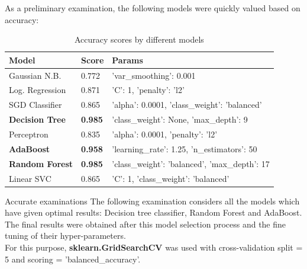 \documentclass{beamer}
\begin{document}
\begin{frame}
As a preliminary examination, the following models were quickly valued based on accuracy:
	

	\begin{table}
	    \begin{tabular}{|l|l|>{\raggedright\arraybackslash}l|}\hline
	         \textbf{Model}&  \textbf{Score}& \textbf{Params} \\\hline
	         Gaussian N.B.&  0.772& 'var\_smoothing': 0.001\\\hline
	         Log. Regression&  0.871& 'C': 1, 'penalty': 'l2'\\\hline
 SGD Classifier& 0.865&'alpha': 0.0001, 'class\_weight': 'balanced'\\\hline
 \textbf{Decision Tree}& \textbf{0.985}&'class\_weight': None, 'max\_depth': 9\\\hline
 Perceptron& 0.835&'alpha': 0.0001, 'penalty': 'l2'\\\hline
 \textbf{AdaBoost}& \textbf{0.958}&'learning\_rate': 1.25, 'n\_estimators': 50\\\hline
 \textbf{Random Forest}& \textbf{0.985}&'class\_weight': 'balanced', 'max\_depth': 17\\\hline
 Linear SVC& 0.865&'C': 1, 'class\_weight': 'balanced'\\ \hline
	    \end{tabular}
	    \caption{Accuracy scores by different models}
	    \label{tab:placeholder}
	\end{table}
    \end{frame}

\begin{frame}{Accurate examinations}
The following examination considers all the models which have given optimal results: Decision tree classifier, Random Forest and AdaBoost. \\The final results were obtained after this model selection process and the fine tuning of their hyper-parameters.
\\For this purpose, \textbf{sklearn.GridSearchCV} was used with cross-validation split = 5 and scoring = 'balanced\_accuracy'.\end{frame}
\end{document}
